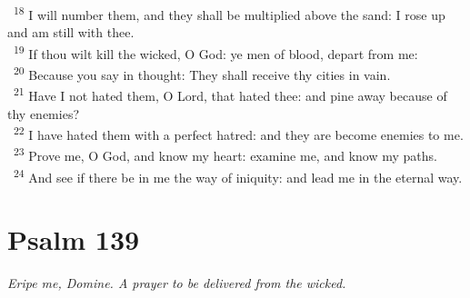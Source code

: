 \documentclass[a5paper,12pt]{article}
\begin{document}
\begin{multicols*}{2}
~\textsuperscript{18} I will number them, and they shall be multiplied above the sand: I rose up and am still with thee.\\
~\textsuperscript{19} If thou wilt kill the wicked, O God: ye men of blood, depart from me:\\
~\textsuperscript{20} Because you say in thought: They shall receive thy cities in vain.\\
~\textsuperscript{21} Have I not hated them, O Lord, that hated thee: and pine away because of thy enemies?\\
~\textsuperscript{22} I have hated them with a perfect hatred: and they are become enemies to me.\\
~\textsuperscript{23} Prove me, O God, and know my heart: examine me, and know my paths.\\
~\textsuperscript{24} And see if there be in me the way of iniquity: and lead me in the eternal way.\\

\section{Psalm 139}
\label{sec:orgd27ee0b}
\emph{Eripe me, Domine. A prayer to be delivered from the wicked.}\\


\end{multicols*}
\end{document}
